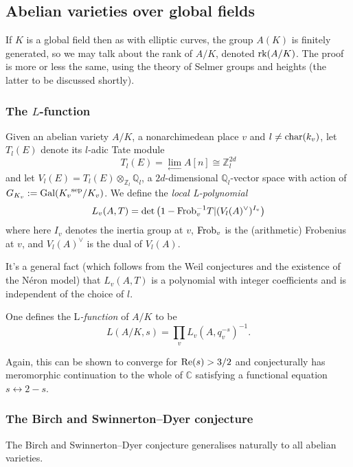\documentclass[12pt]{amsart}
\numberwithin{equation}{section}
\theoremstyle{remark}
\theoremstyle{definition}
\theoremstyle{definition}
\theoremstyle{definition}
\theoremstyle{definition}
\theoremstyle{definition}
\theoremstyle{definition}
\theoremstyle{definition}
\begin{document}
\subsection{Abelian varieties over global fields}

If $K$ is a global field then as with elliptic curves, the group $A(K)$ is finitely generated, so we may talk about the rank of $A/K$, denoted $\textup{rk}(A/K)$. The proof is more or less the same, using the theory of Selmer groups and heights (the latter to be discussed shortly).  

\subsubsection{The $L$-function}

Given an abelian variety $A/K$, a nonarchimedean place $v$ and $l\neq \textup{char}(k_v)$, let $T_l(E)$ denote its $l$-adic Tate module
\[T_l(E)=\lim_{\leftarrow}A[n]\cong \mathbb{Z}_l^{2d}\]
and let $V_l(E)=T_l(E)\otimes _{\mathbb{Z}_l}\mathbb{Q}_l$, a $2d$-dimensional $\mathbb{Q}_l$-vector space with action of $G_{K_v}:=\textup{Gal}({K_v}^{\text{sep}}/K_v)$. We define the \textit{local L-polynomial}
\[L_v(A,T)=\det\left(1-\textup{Frob}_v^{-1}T|(V_l(A)^\vee)^{I_v}\right)\]
where here $I_v$ denotes the inertia group at $v$,  $\textup{Frob}_v$ is the (arithmetic) Frobenius at $v$, and $V_l(A)^{\vee}$ is the dual of $V_l(A)$. 

It's a general fact (which follows from the Weil conjectures and the existence of the N\'{e}ron model) that $L_v(A,T)$ is a polynomial with integer coefficients and is independent of the choice of $l$.  

One defines the L\textit{-function} of $A/K$ to be
\[L(A/K,s)=\prod_{v}L_v(A,q_v^{-s})^{-1}.\]

Again, this can be shown to converge for $\textup{Re}(s)>3/2$ and conjecturally has meromorphic continuation to the whole of $\mathbb{C}$ satisfying a functional equation $s\leftrightarrow 2-s$.

\subsubsection{The Birch and Swinnerton--Dyer conjecture}

The Birch and Swinnerton--Dyer conjecture generalises naturally to all abelian varieties.
\end{document}
